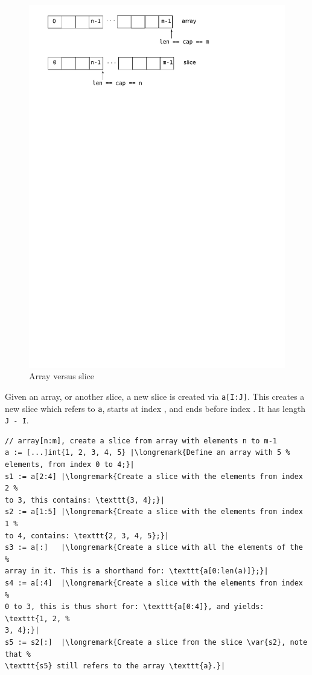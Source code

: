 \begin{figure}[H]
\caption{Array versus slice}
\label{fig:array-vs-slice}
\begin{center}
\includegraphics[scale=0.65]{fig/array-vs-slice.pdf}
\end{center}
\end{figure}

Given an array, or another slice, a new slice is created via
\lstinline{a[I:J]}. This creates a new slice which refers to 
\lstinline{a}, starts at index , and ends
before index . It has length \lstinline{J - I}.

\begin{lstlisting}
// array[n:m], create a slice from array with elements n to m-1
a := [...]int{1, 2, 3, 4, 5} |\longremark{Define an array with 5 %
elements, from index 0 to 4;}|
s1 := a[2:4] |\longremark{Create a slice with the elements from index 2 %
to 3, this contains: \texttt{3, 4};}|
s2 := a[1:5] |\longremark{Create a slice with the elements from index 1 %
to 4, contains: \texttt{2, 3, 4, 5};}|
s3 := a[:]   |\longremark{Create a slice with all the elements of the %
array in it. This is a shorthand for: \texttt{a[0:len(a)]};}|
s4 := a[:4]  |\longremark{Create a slice with the elements from index %
0 to 3, this is thus short for: \texttt{a[0:4]}, and yields: \texttt{1, 2, %
3, 4};}|
s5 := s2[:]  |\longremark{Create a slice from the slice \var{s2}, note that %
\texttt{s5} still refers to the array \texttt{a}.}|
\end{lstlisting}
\showremarks

